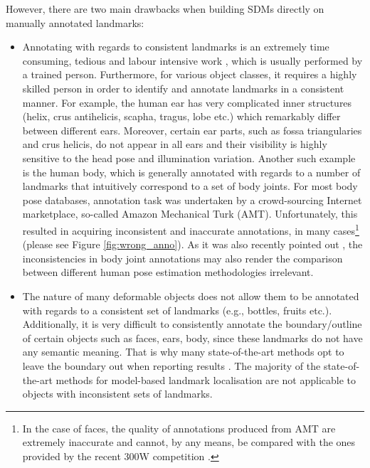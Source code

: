 However, there are two main drawbacks when building SDMs directly on manually annotated landmarks:
\begin{itemize}

\item Annotating with regards to consistent landmarks is an extremely time consuming, tedious and labour intensive work \cite{sagonas_iccv_300w_2013}, which is usually performed by a trained person. Furthermore, for various object classes, it requires a highly skilled person in order to identify and annotate landmarks in a consistent manner. For example, the human ear has very complicated inner structures (helix, crus antihelicis, scapha, tragus, lobe etc.) which remarkably differ between different ears. Moreover, certain ear parts, such as fossa triangularies and crus helicis, do not appear in all ears and their visibility is highly sensitive to the head pose and illumination variation. Another such example is the human body, which is generally annotated with regards to a number of landmarks that intuitively correspond to a set of body joints. For most body pose databases, annotation task was undertaken by a crowd-sourcing Internet marketplace, so-called Amazon Mechanical Turk (AMT). Unfortunately, this resulted in acquiring inconsistent and inaccurate annotations, in many cases\footnote{In the case of faces, the quality of annotations produced from AMT are extremely inaccurate and cannot, by any means, be compared with the ones provided by the recent 300W competition \cite{sagonas_iccv_300w_2013}.} (please see Figure \ref{fig:wrong_anno}). As it was also recently pointed out \cite{tompson2015efficient}, the inconsistencies in body joint annotations may also render the comparison between different human pose estimation methodologies irrelevant.

\item The nature of many deformable objects does not allow them to be annotated with regards to a consistent set of landmarks (e.g., bottles, fruits etc.). Additionally, it is very difficult to consistently annotate the boundary/outline of certain objects such as faces, ears, body, since these landmarks do not have any semantic meaning. That is why many state-of-the-art methods opt to leave the boundary out when reporting results \cite{Tzimiropoulos2014, Asthana2014}. The majority of the state-of-the-art methods for model-based landmark localisation \cite{Cao2012, Zhu2012, Xiong2013, Tzimiropoulos2014, Asthana2014} are not applicable to objects with inconsistent sets of landmarks.

\end{itemize}

